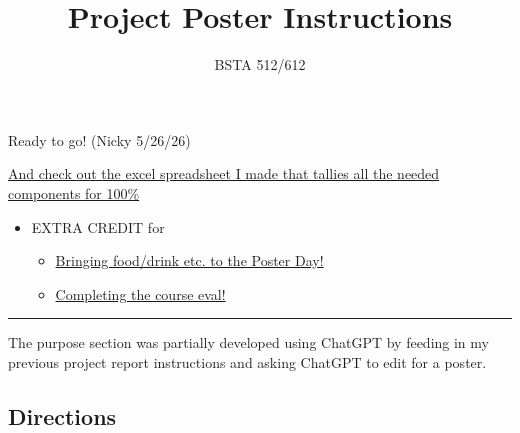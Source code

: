 \documentclass[
  letterpaper,
  DIV=11,
  numbers=noendperiod]{scrartcl}
\title{Project Poster Instructions}
\subtitle{BSTA 512/612}
\author{}
\date{}
\providecommand{\tightlist}{%
  \setlength{\itemsep}{0pt}\setlength{\parskip}{0pt}}
\begin{document}
\maketitle


\begin{tcolorbox}[enhanced jigsaw, arc=.35mm, bottomrule=.15mm, bottomtitle=1mm, breakable, colback=white, colbacktitle=quarto-callout-important-color!10!white, colframe=quarto-callout-important-color-frame, coltitle=black, left=2mm, leftrule=.75mm, opacityback=0, opacitybacktitle=0.6, rightrule=.15mm, title=\textcolor{quarto-callout-important-color}{\faExclamation}\hspace{0.5em}{Important}, titlerule=0mm, toprule=.15mm, toptitle=1mm]

Ready to go! (Nicky 5/26/26)

\href{https://ohsuitg-my.sharepoint.com/:x:/r/personal/wakim_ohsu_edu/Documents/Teaching/Classes/BSTA_513_26S/Student_files_BSTA_513/Project/Resources/Project_Rubric_513_613_26S.xlsx?d=w5ebea0e980ee4149a3897e923c866a0d&csf=1&web=1&e=CGg89t}{And
check out the excel spreadsheet I made that tallies all the needed
components for 100\%}

\begin{itemize}
\tightlist
\item
  EXTRA CREDIT for

  \begin{itemize}
  \tightlist
  \item
    \href{https://forms.office.com/Pages/ResponsePage.aspx?id=V3lz4rj6fk2U9pvWr59xWFMopmPUjRtDiHLswhgacNhUMzU0RkJVVThPNFZZUERNSkdWVlBBWTdEWCQlQCNjPTEu}{Bringing
    food/drink etc. to the Poster Day!}
  \item
    \href{https://forms.office.com/Pages/ResponsePage.aspx?id=V3lz4rj6fk2U9pvWr59xWFMopmPUjRtDiHLswhgacNhUQ1E0UDQ2QUhSRkpPV0JOMzY5TFA0QTUyMSQlQCNjPTEu}{Completing
    the course eval!}
  \end{itemize}
\end{itemize}

\end{tcolorbox}

\begin{center}\rule{0.5\linewidth}{0.5pt}\end{center}

The purpose section was partially developed using ChatGPT by feeding in
my previous project report instructions and asking ChatGPT to edit for a
poster.

\subsection{Directions}\label{directions}
\end{document}
